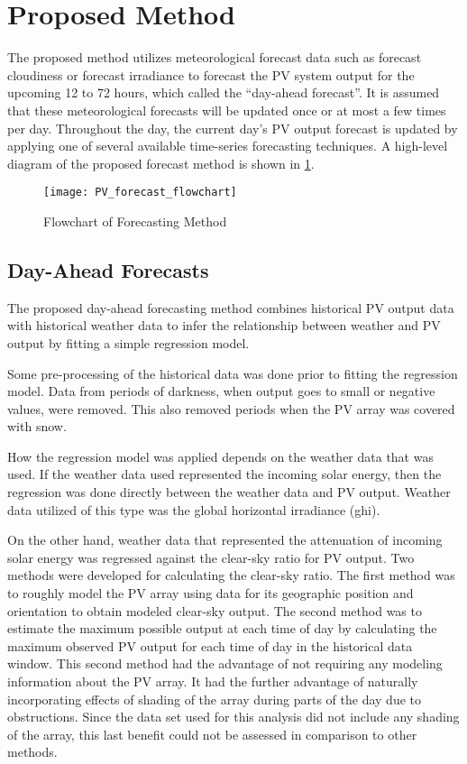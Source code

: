 \section{Proposed Method}
\label{sec:proposed-method}

The proposed method utilizes meteorological forecast data such as forecast cloudiness or forecast irradiance to forecast the PV system output for the upcoming 12 to 72 hours, which called the ``day-ahead forecast''.
It is assumed that these meteorological forecasts will be updated once or at most a few times per day.
Throughout the day, the current day's PV output forecast is updated by applying one of several available time-series forecasting techniques.
A high-level diagram of the proposed forecast method is shown in \cref{fig:PV_forecast_flowchart}.

\begin{figure}[t]
	\centering
	\texttt{[image: PV\_forecast\_flowchart]}
	\caption{Flowchart of Forecasting Method}
	\label{fig:PV_forecast_flowchart}
\end{figure}


\subsection{Day-Ahead Forecasts}
\label{sec:method-day-ahead}

The proposed day-ahead forecasting method combines historical PV output data with historical weather data to infer the relationship between weather and PV output by fitting a simple regression model.

Some pre-processing of the historical data was done prior to  fitting the regression model.
Data from periods of darkness, when output goes to small or negative values, were removed.
This also removed periods when the PV array was covered with snow.

How the regression model was applied depends on the weather data that was used.
If the weather data used represented the incoming solar energy, then the regression was done directly between the weather data and PV output.
Weather data utilized of this type was the global horizontal irradiance (ghi).

On the other hand, weather data that represented the attenuation of incoming solar energy was regressed against the clear-sky ratio for PV output.
Two methods were developed for calculating the clear-sky ratio.
The first method was to roughly model the PV array using data for its geographic position and orientation to obtain modeled clear-sky output.
The second method was to estimate the maximum possible output at each time of day by calculating the maximum observed PV output for each time of day in the historical data window.
This second method had the advantage of not requiring any modeling information about the PV array.
It had the further advantage of naturally incorporating effects of shading of the array during parts of the day due to obstructions.
Since the data set used for this analysis did not include any shading of the array, this last benefit could not be assessed in comparison to other methods.

